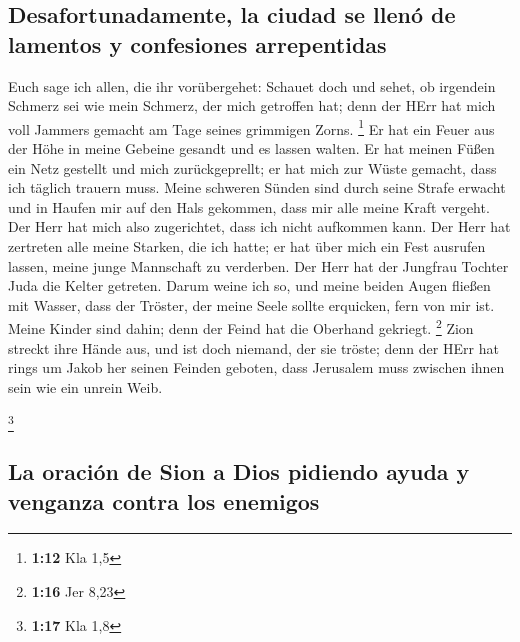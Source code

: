 \hypertarget{desafortunadamente-la-ciudad-se-llenuxf3-de-lamentos-y-confesiones-arrepentidas}{%
\subsection{Desafortunadamente, la ciudad se llenó de lamentos y
confesiones
arrepentidas}\label{desafortunadamente-la-ciudad-se-llenuxf3-de-lamentos-y-confesiones-arrepentidas}}

 Euch sage ich allen, die ihr vorübergehet: Schauet doch
und sehet, ob irgendein Schmerz sei wie mein Schmerz, der mich getroffen
hat; denn der HErr hat mich voll Jammers gemacht am Tage seines
grimmigen Zorns. \footnote{\textbf{1:12} Kla 1,5}  Er hat
ein Feuer aus der Höhe in meine Gebeine gesandt und es lassen walten. Er
hat meinen Füßen ein Netz gestellt und mich zurückgeprellt; er hat mich
zur Wüste gemacht, dass ich täglich trauern muss.  Meine
schweren Sünden sind durch seine Strafe erwacht und in Haufen mir auf
den Hals gekommen, dass mir alle meine Kraft vergeht. Der Herr hat mich
also zugerichtet, dass ich nicht aufkommen kann.  Der
Herr hat zertreten alle meine Starken, die ich hatte; er hat über mich
ein Fest ausrufen lassen, meine junge Mannschaft zu verderben. Der Herr
hat der Jungfrau Tochter Juda die Kelter getreten.  Darum
weine ich so, und meine beiden Augen fließen mit Wasser, dass der
Tröster, der meine Seele sollte erquicken, fern von mir ist. Meine
Kinder sind dahin; denn der Feind hat die Oberhand gekriegt. \footnote{\textbf{1:16}
  Jer 8,23}  Zion streckt ihre Hände aus, und ist doch
niemand, der sie tröste; denn der HErr hat rings um Jakob her seinen
Feinden geboten, dass Jerusalem muss zwischen ihnen sein wie ein unrein
Weib.

\footnote{\textbf{1:17} Kla 1,8}

\hypertarget{la-oraciuxf3n-de-sion-a-dios-pidiendo-ayuda-y-venganza-contra-los-enemigos}{%
\subsection{La oración de Sion a Dios pidiendo ayuda y venganza contra
los
enemigos}\label{la-oraciuxf3n-de-sion-a-dios-pidiendo-ayuda-y-venganza-contra-los-enemigos}}

